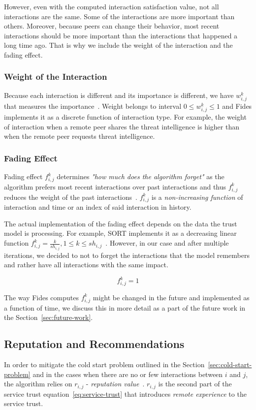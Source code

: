 However, even with the computed interaction satisfaction value, not all interactions are the same. 
Some of the interactions are more important than others. 
Moreover, because peers can change their behavior, most recent interactions should be more important than the interactions that happened a long time ago.
That is why we include the weight of the interaction and the fading effect.

\subsubsection{Weight of the Interaction}
Because each interaction is different and its importance is different, we have $w^{k}_{i,j}$ that measures the importance~\cite{sort}.
Weight belongs to interval $0 \leq w^{k}_{i,j} \leq 1$ and Fides implements it as a discrete function of interaction type. 
For example, the weight of interaction when a remote peer shares the threat intelligence is higher than when the remote peer requests threat intelligence.


\subsubsection{Fading Effect}
\label{subsubsec:fading-effect}
Fading effect $f^{k}_{i,j}$ determines \textit{"how much does the algorithm forget"} as the algorithm prefers most recent interactions over past interactions and thus $f^{k}_{i,j}$ reduces the weight of the past interactions~\cite{sort}. 
$f^{k}_{i,j}$ is a \textit{non-increasing function} of interaction and time or an index of said interaction in history.

The actual implementation of the fading effect depends on the data the trust model is processing.
For example, SORT implements it as a decreasing linear function $f^{k}_{i,j} = \frac{k}{sh_{i,j}}, 1 \leq k \leq sh_{i,j}$~\cite{sort}.
However, in our case and after multiple iterations, we decided to not to forget the interactions that the model remembers and rather have all interactions with the same impact.

\begin{equation}
    f^{k}_{i,j} =1
\end{equation}

\noindent
The way Fides computes $f^{k}_{i,j}$ might be changed in the future and implemented as a function of time, we discuss this in more detail as a part of the future work in the Section~\ref{sec:future-work}.

\subsection{Reputation and Recommendations}
In order to mitigate the cold start problem outlined in the Section~\ref{sec:cold-start-problem} and in the cases when there are no or few interactions between $i$ and $j$, the algorithm relies on $r_{i,j}$ - \textit{reputation value}~\cite{sort}.
$r_{i,j}$ is the second part of the service trust equation~\ref{eq:service-trust} that introduces \textit{remote experience} to the service trust.

